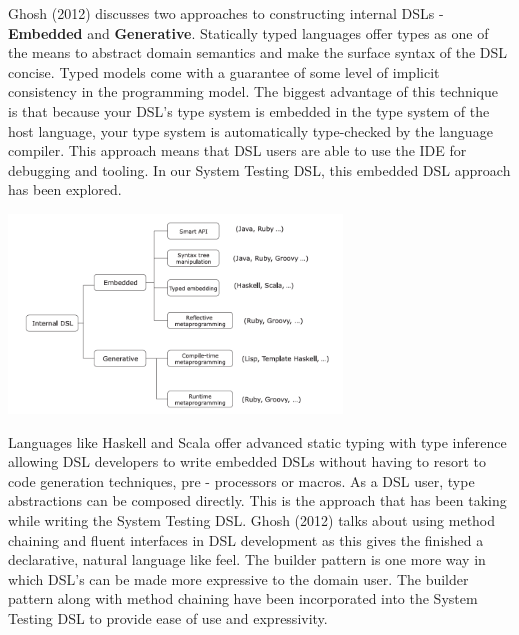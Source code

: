 \documentclass[12 pt]{article}
\begin{document}
\noindent
Ghosh (2012) discusses two approaches to constructing internal DSLs - \textbf{Embedded} and \textbf{Generative}. Statically typed languages offer types as one of the means to abstract domain semantics and make the surface syntax of the DSL concise. Typed models come with a
guarantee of some level of implicit consistency in the programming model. The biggest advantage of this technique is that because your DSL’s type system is embedded in the type system of the host language, your type system is automatically type-checked by the language compiler. This approach means that DSL users are able to use the IDE for debugging and tooling. In our System Testing DSL, this embedded DSL approach has been explored.
\bigskip

\begin{center}
    \includegraphics[height=200px]{figures/classification.png}
\end{center}

\noindent
Languages like Haskell and Scala offer advanced static typing with type inference allowing DSL developers to write embedded DSLs without having to resort to code generation techniques, pre - processors or macros. As a DSL user, type abstractions can be composed directly. This is the approach that has been taking while writing the System Testing DSL. Ghosh (2012) talks about using method chaining and fluent interfaces in DSL development as this gives the finished a declarative, natural language like feel. The builder pattern is one more way in which DSL's can be made more expressive to the domain user. The builder pattern along with method chaining have been incorporated into the System Testing DSL to provide ease of use and expressivity.
\bigskip
\end{document}
